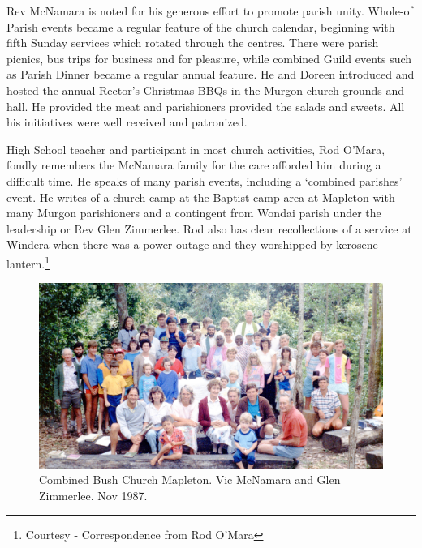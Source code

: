 Rev McNamara is noted for his generous effort to promote parish unity. Whole-of Parish events became a regular feature of the church calendar, beginning with fifth Sunday services which rotated through the centres. There were parish picnics, bus trips for business and for pleasure, while combined Guild events such as Parish Dinner became a regular annual feature. He and Doreen introduced and hosted the annual Rector's Christmas BBQs in the Murgon church grounds and hall. He provided the meat and parishioners provided the salads and sweets. All his initiatives were well received and patronized.



High School teacher and participant in most church activities, Rod O'Mara, fondly remembers the McNamara family for the care afforded him during a difficult time. He speaks of many parish events, including a `combined parishes' event. He writes of a church camp at the Baptist camp area at Mapleton with many Murgon parishioners and a contingent from Wondai parish under the leadership or Rev Glen Zimmerlee. Rod also has clear recollections of a service at Windera when there was a power outage and they worshipped by kerosene lantern.\footnote{Courtesy - Correspondence from Rod O'Mara}








\begin{figure}[!htb]
\begin{center}
\includegraphics[width=1.\textwidth,center]{../images/bushChuchMapleton1987.jpg}
\caption{Combined Bush Church Mapleton. Vic McNamara and Glen Zimmerlee. Nov 1987.}
\end{center}
\end{figure}




